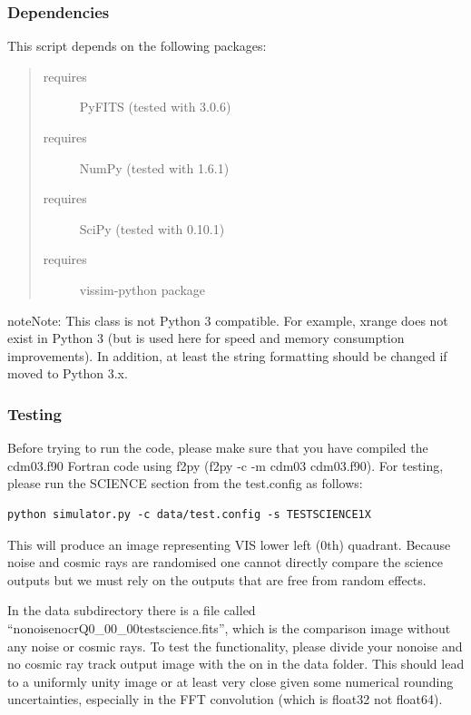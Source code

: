 \documentclass[a4paper,12pt,english]{sphinxmanual}
\begin{document}
\subsubsection{Dependencies}
\label{simulator:dependencies}
This script depends on the following packages:
\begin{quote}\begin{description}
\item[{requires}] \leavevmode
PyFITS (tested with 3.0.6)

\item[{requires}] \leavevmode
NumPy (tested with 1.6.1)

\item[{requires}] \leavevmode
SciPy (tested with 0.10.1)

\item[{requires}] \leavevmode
vissim-python package

\end{description}\end{quote}

\begin{notice}{note}{Note:}
This class is not Python 3 compatible. For example, xrange does not exist
in Python 3 (but is used here for speed and memory consumption improvements).
In addition, at least the string formatting should be changed if moved to
Python 3.x.
\end{notice}


\subsubsection{Testing}
\label{simulator:testing}
Before trying to run the code, please make sure that you have compiled the
cdm03.f90 Fortran code using f2py (f2py -c -m cdm03 cdm03.f90). For testing,
please run the SCIENCE section from the test.config as follows:

\begin{Verbatim}[commandchars=\\\{\}]
python simulator.py -c data/test.config -s TESTSCIENCE1X
\end{Verbatim}

This will produce an image representing VIS lower left (0th) quadrant. Because
noise and cosmic rays are randomised one cannot directly compare the science
outputs but we must rely on the outputs that are free from random effects.

In the data subdirectory there is a file called ``nonoisenocrQ0\_00\_00testscience.fits'',
which is the comparison image without any noise or cosmic rays. To test the functionality,
please divide your nonoise and no cosmic ray track output image with the on in the data
folder. This should lead to a uniformly unity image or at least very close given some
numerical rounding uncertainties, especially in the FFT convolution (which is float32 not
float64).
\end{document}
